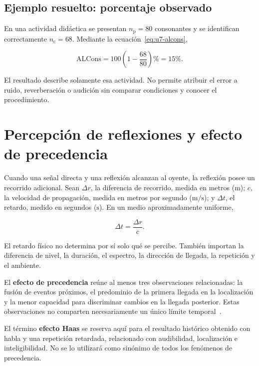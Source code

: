 \subsection{Ejemplo resuelto: porcentaje observado}
\label{sec:u7-ejemplo-alcons}

En una actividad didáctica se presentan \(n_\mathrm{p}=80\) consonantes y se
identifican correctamente \(n_\mathrm{c}=68\). Mediante la
ecuación~\eqref{eq:u7-alcons},

\[
    \mathrm{ALCons}
      =100\left(1-\frac{68}{80}\right)\%
      =15\%.
\]

El resultado describe solamente esa actividad. No permite atribuir el error a
ruido, reverberación o audición sin comparar condiciones y conocer el
procedimiento.

\section{Percepción de reflexiones y efecto de precedencia}
\label{sec:u7-precedencia}

Cuando una señal directa y una reflexión alcanzan al oyente, la reflexión
posee un recorrido adicional. Sean \(\Delta r\), la diferencia de recorrido,
medida en metros (\(\text{m}\)); \(c\), la velocidad de propagación, medida en
metros por segundo (\(\text{m}/\text{s}\)); y \(\Delta t\), el retardo,
medido en segundos (\(\text{s}\)). En un medio aproximadamente uniforme,

\begin{equation}
    \Delta t=\frac{\Delta r}{c}.
    \label{eq:u7-retardo-reflexion}
\end{equation}

El retardo físico no determina por sí solo qué se percibe. También importan la
diferencia de nivel, la duración, el espectro, la dirección de llegada, la
repetición y el ambiente.

El \textbf{efecto de precedencia} reúne al menos tres observaciones
relacionadas: la fusión de eventos próximos, el predominio de la primera
llegada en la localización y la menor capacidad para discriminar cambios en la
llegada posterior. Estas observaciones no comparten necesariamente un único
límite temporal~\cite{litovsky1999}.

El término \textbf{efecto Haas} se reserva aquí para el resultado histórico
obtenido con habla y una repetición retardada, relacionado con audibilidad,
localización e inteligibilidad. No se lo utilizará como sinónimo de todos los
fenómenos de precedencia.

